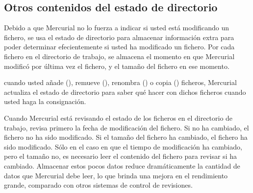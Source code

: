\subsection{Otros contenidos del estado de directorio}

Debido a que Mercurial no lo fuerza a indicar si usted está
modificando un fichero, se usa el estado de directorio para almacenar
información extra para poder determinar efecientemente si usted ha
modificado un fichero. Por cada fichero en el directorio de trabajo,
se almacena el momento en que Mercurial modificó por última vez el
fichero, y el tamaño del fichero en ese momento.

cuando usted añade (), remueve (), renombra
() o copia () ficheros, Mercurial actualiza
el estado de directorio para saber qué hacer con dichos ficheros
cuando usted haga la consignación.

Cuando Mercurial está revisando el estado de los ficheros en el
directorio de trabajo, revisa primero la fecha de modificación del
fichero. Si no ha cambiado, el fichero no ha sido modificado. Si el
tamaño del fichero ha cambiado, el fichero ha sido modificado. Sólo en
el caso en que el tiempo de modificación ha cambiado, pero el tamaño
no, es necesario leer el contenido del fichero para revisar si ha
cambiado. Almacenar estos pocos datos reduce dramáticamente la
cantidad de datos que Mercurial debe leer, lo que brinda una mejora en
el rendimiento grande, comparado con otros sistemas de control de
revisiones.

